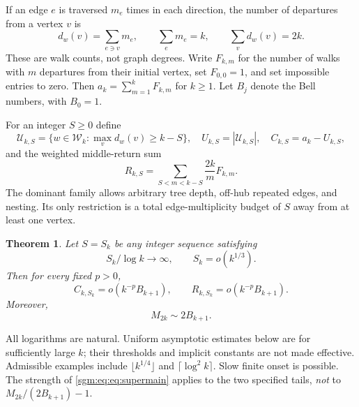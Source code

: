 \documentclass[11pt,letterpaper]{article}
\newtheorem{theorem}{Theorem}[section]
\theoremstyle{remark}\newtheorem{remark}[theorem]{Remark}
\newcommand{\Wc}{\mathcal W}\newcommand{\Uc}{\mathcal U}\newcommand{\Part}{\operatorname{Part}}
\theoremstyle{definition}\newtheorem{definition}[theorem]{Definition}
\begin{document}
If an edge $e$ is traversed $m_e$ times in each direction, the number of departures from a vertex $v$ is
\begin{equation}\label{sgm:eq:eq:visits}
 d_w(v)=\sum_{e\ni v}m_e,\qquad \sum_e m_e=k,\qquad \sum_vd_w(v)=2k.
\end{equation}
These are walk counts, not graph degrees. Write $F_{k,m}$ for the number of walks with $m$ departures from their initial vertex, set $F_{0,0}=1$, and set impossible entries to zero. Then $a_k=\sum_{m=1}^kF_{k,m}$ for $k\ge1$. Let $B_j$ denote the Bell numbers, with $B_0=1$.

For an integer $S\ge0$ define
\[
 \Uc_{k,S}=\{w\in\Wc_k:\max_vd_w(v)\ge k-S\},\quad
 U_{k,S}=|\Uc_{k,S}|,\quad C_{k,S}=a_k-U_{k,S},
\]
and the weighted middle-return sum
\begin{equation}\label{sgm:eq:eq:R}
 R_{k,S}=\sum_{S<m<k-S}\frac{2k}{m}F_{k,m}.
\end{equation}
The dominant family allows arbitrary tree depth, off-hub repeated edges, and nesting. Its only restriction is a total edge-multiplicity budget of $S$ away from at least one vertex.

\begin{theorem}\label{sgm:eq:thm:main}
Let $S=S_k$ be any integer sequence satisfying
\begin{equation}\label{sgm:eq:eq:window}
 S_k/\log k\longrightarrow\infty,\qquad S_k=o(k^{1/3}).
\end{equation}
Then for every fixed $p>0$,
\begin{equation}\label{sgm:eq:eq:supermain}
 C_{k,S_k}=o(k^{-p}B_{k+1}),\qquad
 R_{k,S_k}=o(k^{-p}B_{k+1}).
\end{equation}
Moreover,
\begin{equation}\label{sgm:eq:eq:fullmain}
 M_{2k}\sim2B_{k+1}.
\end{equation}
\end{theorem}
All logarithms are natural. Uniform asymptotic estimates below are for sufficiently large $k$; their thresholds and implicit constants are not made effective. Admissible examples include $\lfloor k^{1/4}\rfloor$ and $\lceil\log^2k\rceil$. Slow finite onset is possible. The strength of \eqref{sgm:eq:eq:supermain} applies to the two specified tails, \emph{not} to $M_{2k}/(2B_{k+1})-1$.
\end{document}
